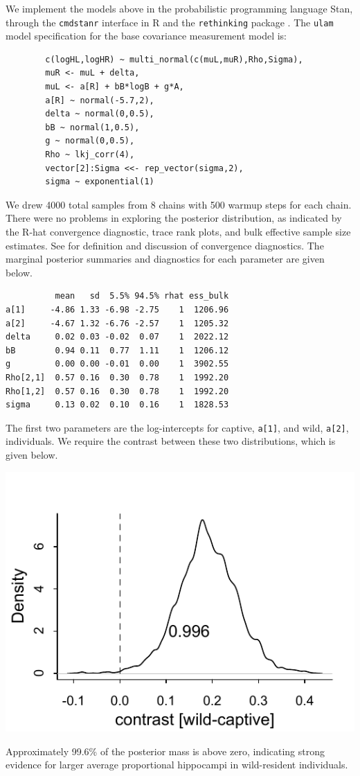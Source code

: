 \documentclass[reqno ,11pt]{amsart}
\begin{document}
We implement the models above in the probabilistic programming language Stan, through the \texttt{cmdstanr} interface in R \citep{cmdstanr2025} and the \texttt{rethinking} package \citep{rethinking2024}. The \texttt{ulam} model specification for the base covariance measurement model is:
\begin{verbatim}
        c(logHL,logHR) ~ multi_normal(c(muL,muR),Rho,Sigma),
        muR <- muL + delta,
        muL <- a[R] + bB*logB + g*A,
        a[R] ~ normal(-5.7,2),
        delta ~ normal(0,0.5),
        bB ~ normal(1,0.5),
        g ~ normal(0,0.5),
        Rho ~ lkj_corr(4),
        vector[2]:Sigma <<- rep_vector(sigma,2),
        sigma ~ exponential(1)
\end{verbatim}
We drew 4000 total samples from 8 chains with 500 warmup steps for each chain. There were no problems in exploring the posterior distribution, as indicated by the R-hat convergence diagnostic, trace rank plots, and bulk effective sample size estimates. See \cite{Vehtari_2021} for definition and discussion of convergence diagnostics. The marginal posterior summaries and diagnostics for each parameter are given below.
\begin{verbatim}
          mean   sd  5.5% 94.5% rhat ess_bulk
a[1]     -4.86 1.33 -6.98 -2.75    1  1206.96
a[2]     -4.67 1.32 -6.76 -2.57    1  1205.32
delta     0.02 0.03 -0.02  0.07    1  2022.12
bB        0.94 0.11  0.77  1.11    1  1206.12
g         0.00 0.00 -0.01  0.00    1  3902.55
Rho[2,1]  0.57 0.16  0.30  0.78    1  1992.20
Rho[1,2]  0.57 0.16  0.30  0.78    1  1992.20
sigma     0.13 0.02  0.10  0.16    1  1828.53
\end{verbatim}

The first two parameters are the log-intercepts for captive, \texttt{a[1]}, and wild, \texttt{a[2]}, individuals. We require the contrast between these two distributions, which is given below.
\begin{center}
	\includegraphics[scale=0.7]{fig_post_contrast_m1.pdf}
\end{center}
Approximately 99.6\% of the posterior mass is above zero, indicating strong evidence for larger average proportional hippocampi in wild-resident individuals.

\clearpage
 

\end{document}
